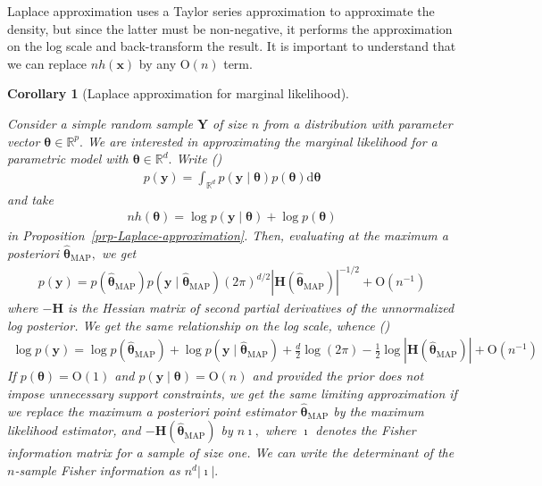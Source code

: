 \documentclass[
  11pt,
  letterpaper,
]{scrbook}
\theoremstyle{definition}
\theoremstyle{definition}
\theoremstyle{definition}
\theoremstyle{plain}
\theoremstyle{plain}
\theoremstyle{plain}
\newtheorem{corollary}{Corollary}[chapter]
\theoremstyle{remark}
\begin{document}
Laplace approximation uses a Taylor series approximation to approximate
the density, but since the latter must be non-negative, it performs the
approximation on the log scale and back-transform the result. It is
important to understand that we can replace \(nh(\boldsymbol{x})\) by
any \(\mathrm{O}(n)\) term.

\begin{corollary}[Laplace approximation for marginal
likelihood]\protect\hypertarget{cor-laplace-loglik}{}\label{cor-laplace-loglik}

Consider a simple random sample \(\boldsymbol{Y}\) of size \(n\) from a
distribution with parameter vector
\(\boldsymbol{\theta} \in \mathbb{R}^p.\) We are interested in
approximating the marginal likelihood for a parametric model with
\(\boldsymbol{\theta} \in \mathbb{R}^d.\) Write
() \begin{align*}
 p(\boldsymbol{y}) = \int_{\mathbb{R}^d} p(\boldsymbol{y} \mid \boldsymbol{\theta}) p(\boldsymbol{\theta}) \mathrm{d} \boldsymbol{\theta}
\end{align*} and take
\begin{align*}nh(\boldsymbol{\theta}) = \log p(\boldsymbol{y} \mid \boldsymbol{\theta}) + \log p(\boldsymbol{\theta})
\end{align*} in Proposition~\ref{prp-Laplace-approximation}. Then,
evaluating at the maximum a posteriori
\(\widehat{\boldsymbol{\theta}}_{\mathrm{MAP}},\) we get \begin{align*}
 p(\boldsymbol{y}) = p(\widehat{\boldsymbol{\theta}}_{\mathrm{MAP}})p(\boldsymbol{y} \mid \widehat{\boldsymbol{\theta}}_{\mathrm{MAP}}) (2\pi)^{d/2}|\mathbf{H}(\widehat{\boldsymbol{\theta}}_{\mathrm{MAP}})|^{-1/2} + \mathrm{O}(n^{-1})
\end{align*} where \(-\mathbf{H}\) is the Hessian matrix of second
partial derivatives of the unnormalized log posterior. We get the same
relationship on the log scale, whence
()
\begin{align*}
 \log p(\boldsymbol{y}) = \log p(\widehat{\boldsymbol{\theta}}_{\mathrm{MAP}}) + \log p(\boldsymbol{y} \mid \widehat{\boldsymbol{\theta}}_{\mathrm{MAP}}) + \frac{d}{2} \log (2\pi) - \frac{1}{2}\log |\mathbf{H}(\widehat{\boldsymbol{\theta}}_{\mathrm{MAP}})| + \mathrm{O}(n^{-1})
\end{align*} If \(p(\boldsymbol{\theta}) = \mathrm{O}(1)\) and
\(p(\boldsymbol{y} \mid \boldsymbol{\theta}) = \mathrm{O}(n)\) and
provided the prior does not impose unnecessary support constraints, we
get the same limiting approximation if we replace the maximum a
posteriori point estimator
\(\widehat{\boldsymbol{\theta}}_{\mathrm{MAP}}\) by the maximum
likelihood estimator, and
\(-\mathbf{H}(\widehat{\boldsymbol{\theta}}_{\mathrm{MAP}})\) by
\(n\boldsymbol{\imath},\) where \(\boldsymbol{\imath}\) denotes the
Fisher information matrix for a sample of size one. We can write the
determinant of the \(n\)-sample Fisher information as
\(n^{d}|\boldsymbol{\imath}|.\)


\end{corollary}
\end{document}
